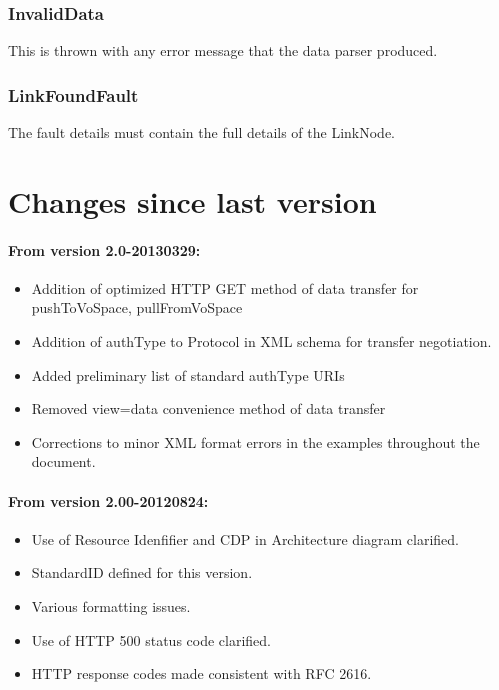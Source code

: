 \documentclass[11pt,a4paper]{ivoa}
\begin{document}
\subsubsection{InvalidData}
This is thrown with any error message that the data parser produced.

\subsubsection{LinkFoundFault}
The fault details must contain the full details of the LinkNode.

\section{Changes since last version}

\paragraph{From version 2.0-20130329:}
\begin{itemize}
    \item Addition of optimized HTTP GET method of data transfer for pushToVoSpace, pullFromVoSpace
    \item Addition of authType to Protocol in XML schema for transfer negotiation.
    \item Added preliminary list of standard authType URIs
    \item Removed view=data convenience method of data transfer
    \item Corrections to minor XML format errors in the examples throughout the document.
\end{itemize}

\paragraph{From version 2.00-20120824:}
\begin{itemize}
    \item Use of Resource Idenfifier and CDP in Architecture diagram clarified.
    \item StandardID defined for this version.
    \item Various formatting issues.
    \item Use of HTTP 500 status code clarified.
    \item HTTP response codes made consistent with RFC 2616.
\end{itemize}
\end{document}
